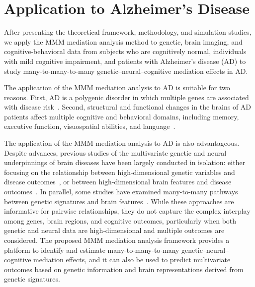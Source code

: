 \documentclass[
  12pt]{article}
\begin{document}
\section{Application to Alzheimer's Disease}
\label{sec:data_analysis}

After presenting the theoretical framework, methodology, and simulation studies, we apply the MMM mediation analysis method to genetic, brain imaging, and cognitive-behavioral data from subjects who are cognitively normal, individuals with mild cognitive impairment, and patients with Alzheimer’s disease (AD) to study many-to-many-to-many genetic–neural–cognitive mediation effects in AD. 


The application of the MMM mediation analysis to AD is suitable for two reasons. First, AD is a polygenic disorder in which multiple genes are associated with disease risk~\citep{harrisonPolygenicScoresPrecision2020, bellenguez2022new}. Second, structural and functional changes in the brains of AD patients affect multiple cognitive and behavioral domains, including memory, executive function, visuospatial abilities, and language~\citep{Diaz2025OPTIMUS}. 

The application of the MMM mediation analysis to AD is also advantageous. Despite advances, previous studies of the multivariate genetic and neural underpinnings of brain diseases have been largely conducted in isolation: either focusing on the relationship between high-dimensional genetic variables and disease outcomes~\citep{kunkle2019genetic}, or between high-dimensional brain features and disease outcomes~\citep{smith2015positive}. In parallel, some studies have examined many-to-many pathways between genetic signatures and brain features~\citep{tissink2024abundant}. While these approaches are informative for pairwise relationships, they do not capture the complex interplay among genes, brain regions, and cognitive outcomes, particularly when both genetic and neural data are high-dimensional and multiple outcomes are considered.
The proposed MMM mediation analysis framework provides a platform to identify and estimate many-to-many-to-many genetic–neural–cognitive mediation effects, and it can also be used to predict multivariate outcomes based on genetic information and brain representations derived from genetic signatures. 
\end{document}
